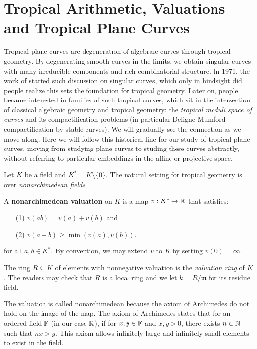 \section{Tropical Arithmetic, Valuations and Tropical Plane Curves}
\label{sec:tropical-arithmetic-valuations-tropical-plane-curves}
    Tropical plane curves are degeneration of algebraic curves through 
    tropical geometry. 
    By degenerating smooth curves in the limits, we obtain singular curves
    with many irreducible components and rich combinatorial structure. 
    In 1971, the work of \citet{Bergman1971} started such discussion on singular curves,
    which only in hindsight did people realize this sets the foundation for 
    tropical geometry. 
    Later on, people became interested in families of such tropical curves,
    which sit in the intersection of classical algebraic geometry 
    and tropical geometry: 
    the \emph{tropical moduli space of curves} 
    and its compactification problems
    (in particular Deligne-Mumford compactification by stable curves).
    We will gradually see the connection as we move along.
    Here we will follow this historical line 
    for our study of tropical plane curves,
    moving from studying plane curves 
    to studing these curves abstractly,
    without referring to particular embeddings 
    in the affine or projective space.
    
    Let $K$ be a field and $K^\ast = K \setminus \{0\}$.
    The natural setting for tropical geometry is over 
    \emph{nonarchimedean fields}. 
    \begin{definition}
    	A \textbf{nonarchimedean valuation } on $K$ is a map 
	$v: K^\ast \rightarrow \mathbb{R}$ that satisfies:
	\begin{enumerate}
		\item[(1)]
		$v(ab) = v(a) + v(b)$ and 
		\item[(2)]
		$v(a+b) \ge \min(v(a), v(b))$.
	\end{enumerate}
	for all $a, b \in K^\ast$. 
	By convention, we may extend $v$ to $K$ by setting $v(0) = \infty$.
    \end{definition}
    The ring $R \subseteq K$ of elements with nonnegative valuation 
    is the \emph{valuation ring} of $K$.
    The readers may check that $R$ is a local ring and 
    we let $k = R/\mathfrak{m}$ for its residue field. 
    
    \begin{remark}
    	The valuation is called nonarchimedean because 
	the axiom of Archimedes do not hold on the image of the map.
	The axiom of Archimedes states that 
	for an ordered field $\mathbb{F}$ (in our case $\mathbb{R}$),
	if for $x, y \in \mathbb{F}$ and $x, y > 0$, there exists $n \in \mathbb{N}$ such that 
	$nx > y$. 
	This axiom allows infinitely large and infinitely small elements to exist
	in the field. 
    \end{remark}
    
